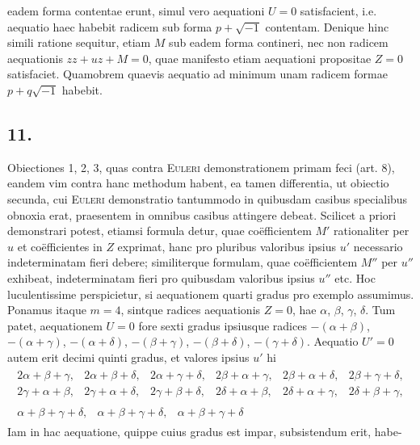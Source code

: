 \documentclass[twoside,12pt, showframe]{memoir}
\begin{document}
eadem forma contentae erunt, simul vero aequationi \(U=0\) satisfacient, i.e. aequatio haec habebit radicem sub forma \(p + \surd{-1}\) contentam. Denique hinc simili ratione sequitur, etiam \(M\) sub eadem forma contineri, nec non radicem aequationis \(zz+uz+M=0\), quae manifesto etiam aequationi propositae \(Z=0\) satisfaciet. Quamobrem quaevis aequatio ad minimum unam radicem formae \(p+q\surd{-1}\) habebit.

\subsection*{11.}

Obiectiones 1, 2, 3, quas contra \textsc{Euleri} demonstrationem primam feci (art. 8), eandem vim contra hanc methodum habent, ea tamen differentia, ut obiectio secunda, cui \textsc{Euleri} demonstratio tantummodo in quibusdam casibus specialibus obnoxia erat, praesentem in omnibus casibus attingere debeat. Scilicet a priori demonstrari potest, etiamsi formula detur, quae co\"efficientem \(M'\) rationaliter per \(u\) et co\"efficientes in \(Z\) exprimat, hanc pro pluribus valoribus ipsius \(u'\) necessario indeterminatam fieri debere; similiterque formulam, quae co\"efficientem \(M''\) per \(u''\) exhibeat, indeterminatam fieri pro quibusdam valoribus ipsius \(u''\) etc{.} Hoc luculentissime perspicietur, si aequationem quarti gradus pro exemplo assumimus. Ponamus itaque \(m= 4\), sintque radices aequationis \(Z = 0\), hae \(\alpha\), \(\beta\), \(\gamma\), \(\delta\). Tum patet, aequationem \(U = 0\) fore sexti gradus ipsiusque radices \(-(\alpha+\beta)\), \(-(\alpha+\gamma)\), \(-(\alpha+\delta)\), \(-(\beta+\gamma)\), \(-(\beta+\delta)\), \(-(\gamma+\delta)\). Aequatio \(U'=0\) autem erit decimi quinti gradus, et valores ipsius \(u'\) hi \[ \begin{array}{c} \begin{array}{cccccc} 2\alpha+\beta+\gamma, & 2\alpha + \beta + \delta,& 2\alpha + \gamma + \delta, & 2\beta + \alpha + \gamma,& 2\beta + \alpha + \delta, & 2\beta + \gamma + \delta,\\ 2\gamma+ \alpha + \beta, & 2\gamma + \alpha + \delta,& 2 \gamma + \beta + \delta,& 2 \delta + \alpha + \beta, &2\delta + \alpha + \gamma, &2\delta + \beta + \gamma, \end{array} \\
\begin{array}{ccc} \alpha + \beta + \gamma + \delta, & \alpha + \beta + \gamma + \delta, & \alpha + \beta + \gamma + \delta \end{array} \end{array} \] Iam in hac aequatione, quippe cuius gradus est impar, subsistendum erit, habe-
\end{document}
